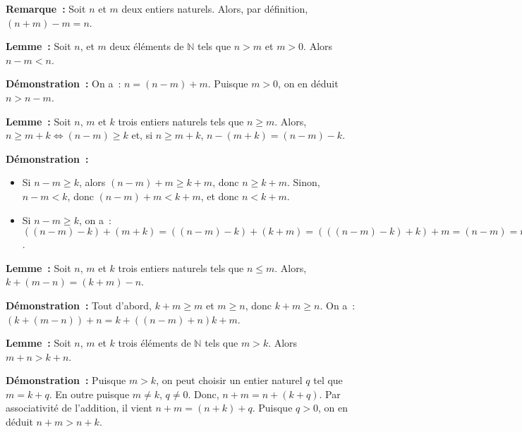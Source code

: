   \done 

\medskip

\noindent\textbf{Remarque :} Soit $n$ et $m$ deux entiers naturels.
    Alors, par définition, $(n+m) - m  = n$.

\medskip

\noindent\textbf{Lemme :} Soit $n$, et $m$ deux éléments de $\mathbb{N}$ tels que $n > m$ et $m > 0$. 
    Alors $n - m < n$.

\medskip

\noindent\textbf{Démonstration :} 
    On a : $n = (n-m) + m$.
    Puisque $m > 0$, on en déduit $n > n-m$.

    \done

\medskip

\noindent\textbf{Lemme :} Soit $n$, $m$ et $k$ trois entiers naturels tels que $n \geq m$.
    Alors, $n \geq m+k \Leftrightarrow (n-m) \geq k$ et, si $n \geq m+k$, $n - (m + k) = (n-m) - k$.

\medskip

\noindent\textbf{Démonstration :} 
\begin{itemize}[nosep]
    \item Si $n-m \geq k$, alors $(n-m) + m \geq k + m$, donc $n \geq k + m$.
        Sinon, $n-m < k$, donc $(n-m)+m < k + m$, et donc $n < k + m$.
    \item Si $n-m \geq k$, on a : $((n-m)-k) + (m+k) = ((n-m)-k) + (k+m) = (((n-m)-k) + k) + m = (n-m) = m = n$.
\end{itemize}

\done

\medskip

\noindent\textbf{Lemme :} Soit $n$, $m$ et $k$ trois entiers naturels tels que $n \leq m$.
    Alors, $k + (m-n) = (k+m) - n$.

\medskip

\noindent\textbf{Démonstration :} Tout d'abord, $k+m \geq m$ et $m \geq n$, donc $k+m \geq n$.
    On a : $(k + (m-n)) + n = k + ((n-m) + n)  k + m$.

   \done  

\medskip

\noindent\textbf{Lemme :} Soit $n$, $m$ et $k$ trois éléments de $\mathbb{N}$ tels que $m > k$. 
    Alors $m + n > k + n$.

\medskip

\noindent\textbf{Démonstration :} 
    Puisque $m > k$, on peut choisir un entier naturel $q$ tel que $m = k + q$. 
    En outre puisque $m \neq k$, $q \neq 0$.
    Donc, $n + m = n + (k + q)$. 
    Par associativité de l'addition, il vient $n + m = (n + k) + q$. 
    Puisque $q > 0$, on en déduit $n + m > n + k$.

